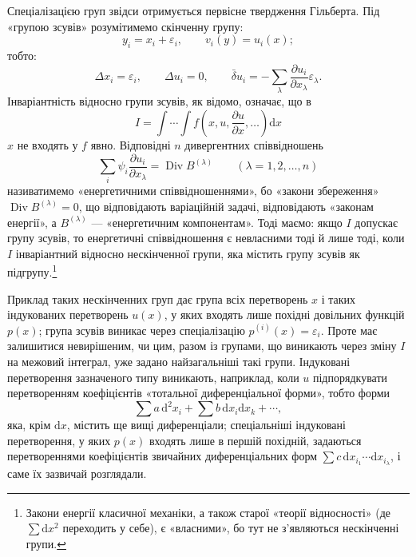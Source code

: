 \documentclass[11pt]{article}
\providecommand{\eps}{\varepsilon}
\providecommand{\D}{\Delta}
\providecommand{\p}{\partial}
\providecommand{\dd}{\mathrm d}
\DeclareMathOperator{\Div}{Div}
\providecommand{\bd}{\bar{\delta}}
\begin{document}
Спеціалізацією груп звідси отримується первісне твердження Гільберта. Під «групою зсувів» розумітимемо скінченну групу:
\[
y_i=x_i+\eps_i,\qquad v_i(y)=u_i(x);
\]
тобто:
\[
\D x_i=\eps_i,\qquad \D u_i=0,\qquad
\bd u_i=-\sum_\lambda\frac{\p u_i}{\p x_\lambda}\eps_\lambda.
\]
Інваріантність відносно групи зсувів, як відомо, означає, що в
\[
I=\int\!\cdots\!\int f\!\left(x,u,\frac{\p u}{\p x},\ldots\right)\dd x
\]
\(x\) не входять у \(f\) явно. Відповідні \(n\) дивергентних співвідношень
\[
\sum_i\psi_i\frac{\p u_i}{\p x_\lambda}=\Div B^{(\lambda)}
\qquad(\lambda=1,2,\ldots,n)
\]
називатимемо «енергетичними співвідношеннями», бо «закони збереження» \(\Div B^{(\lambda)}=0\), що відповідають варіаційній задачі, відповідають «законам енергії», а \(B^{(\lambda)}\) --- «енергетичним компонентам». Тоді маємо: якщо \(I\) допускає групу зсувів, то енергетичні співвідношення є невласними тоді й лише тоді, коли \(I\) інваріантний відносно нескінченної групи, яка містить групу зсувів як підгрупу.\footnote{Закони енергії класичної механіки, а також старої «теорії відносності» (де \(\sum \dd x^2\) переходить у себе), є «власними», бо тут не з'являються нескінченні групи.}

Приклад таких нескінченних груп дає група всіх перетворень \(x\) і таких індукованих перетворень \(u(x)\), у яких входять лише похідні довільних функцій \(p(x)\); група зсувів виникає через спеціалізацію \(p^{(i)}(x)=\eps_i\). Проте має залишитися невирішеним, чи цим, разом із групами, що виникають через зміну \(I\) на межовий інтеграл, уже задано найзагальніші такі групи. Індуковані перетворення зазначеного типу виникають, наприклад, коли \(u\) підпорядкувати перетворенням коефіцієнтів «тотальної диференціальної форми», тобто форми
\[
\sum a\,\dd^2x_i+\sum b\,\dd x_i\dd x_k+\cdots,
\]
яка, крім \(\dd x\), містить ще вищі диференціали; спеціальніші індуковані перетворення, у яких \(p(x)\) входять лише в першій похідній, задаються перетвореннями коефіцієнтів звичайних диференціальних форм \(\sum c\,\dd x_{i_1}\cdots \dd x_{i_\lambda}\), і саме їх зазвичай розглядали.
\end{document}
